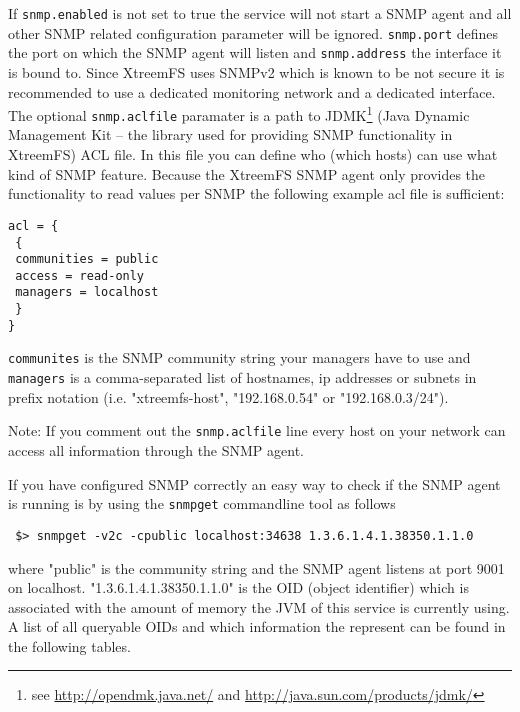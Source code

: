 \documentclass[a4paper,10pt]{book}
\begin{document}
If \texttt{snmp.enabled} is not set to true the service will not start a SNMP agent and all other SNMP related configuration parameter will be ignored.  \texttt{snmp.port} defines the port on which the SNMP agent will listen and \texttt{snmp.address} the interface it is bound to. Since XtreemFS uses SNMPv2 which is known to be not secure it is recommended to use a dedicated monitoring network and a dedicated interface. The optional \texttt{snmp.aclfile} paramater is a path to JDMK\footnote{see \url{http://opendmk.java.net/} and \url{http://java.sun.com/products/jdmk/}} (Java Dynamic Management Kit -- the library used for providing SNMP functionality in XtreemFS) ACL file. In this file you can define who (which hosts) can use what kind of SNMP feature. Because the XtreemFS SNMP agent only provides the functionality to read values per SNMP the following example acl file is sufficient:
\begin{verbatim}
acl = {
 {
 communities = public
 access = read-only
 managers = localhost
 }
}
\end{verbatim}
\texttt{communites} is the SNMP community string your managers have to use and \texttt{managers} is a comma-separated list of hostnames, ip addresses or subnets in prefix notation (i.e. "xtreemfs-host", "192.168.0.54" or "192.168.0.3/24").

Note: If you comment out the \texttt{snmp.aclfile} line every host on your network can access all information through the SNMP agent.

If you have configured SNMP correctly an easy way to check if the SNMP agent is running is by using the \texttt{snmpget} commandline tool as follows
\begin{verbatim}
 $> snmpget -v2c -cpublic localhost:34638 1.3.6.1.4.1.38350.1.1.0
\end{verbatim}
where "public" is the community string and the SNMP agent listens at port 9001 on localhost. "1.3.6.1.4.1.38350.1.1.0" is the OID (object identifier) which is associated with the amount of memory the JVM of this service is currently using. A list of all queryable OIDs and which information the represent can be found in the following tables.
\end{document}
